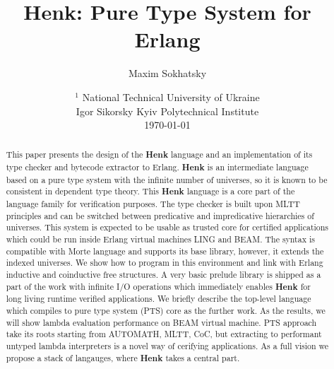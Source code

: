 \documentclass{article}
\begin{document}
\title{Henk: Pure Type System for Erlang}
\author{Maxim Sokhatsky}
\date{ $^1$ National Technical University of Ukraine \\
       \small Igor Sikorsky Kyiv Polytechnical Institute\\
       \today }

\maketitle

\begin{abstract}
This paper presents the design of the {\bf Henk} language and an implementation of its type checker and bytecode extractor to Erlang.
{\bf Henk} is an intermediate language based on a pure type system with the infinite number of universes, so it is known to be consistent in dependent type theory.
This {\bf Henk} language is a core part of the language family for verification purposes.
The type checker is built upon MLTT principles and can be switched between predicative and impredicative hierarchies of universes.
This system is expected to be usable as trusted core for certified applications which could be run inside Erlang virtual machines LING and BEAM.
The syntax is compatible with Morte language and supports its base library, however, it extends the indexed universes.
We show how to program in this environment and link with Erlang inductive and coinductive free structures.
A very basic prelude library is shipped as a part of the work with infinite I/O operations which
immediately enables {\bf Henk} for long living runtime verified applications.
We briefly describe the top-level language which compiles to pure type system (PTS) core as the further work.
As the results, we will show lambda evaluation performance on BEAM virtual machine.
PTS approach take its roots starting from AUTOMATH, MLTT, CoC,
but extracting to performant untyped lambda interpreters is a novel way of cerifying applications.
As a full vision we propose a stack of langauges, where {\bf Henk} takes a central part.
\end{abstract}

\newpage
\tableofcontents
\newpage
\end{document}
